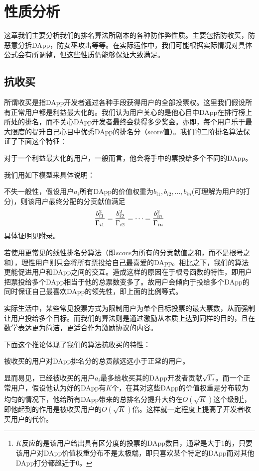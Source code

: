 \section{性质分析}
\label{section:properties}
这章我们主要分析我们的排名算法所剧本的各种防作弊性质。主要包括防收买，防恶意分拆DApp，防女巫攻击等等。在实际运作中，我们可能根据实际情况对具体公式会有所调整，但这些性质仍能够保证大致满足。

\subsection{抗收买}
所谓收买是指DApp开发者通过各种手段获得用户的全部投票权。这里我们假设所有正常用户都是利益最大化的。我们认为用户关心的是他心目中DApp在排行榜上所处的排名，而不关心DApp开发者最终会获得多少奖金。亦即，每个用户乐于最大限度的提升自己心目中优秀DApp的排名分（score值）。我们的二阶排名算法保证了下面这个特征：

\begin{property}
	\label{p1}
	对于一个利益最大化的用户，一般而言，他会将手中的票投给多个不同的DApp。
\end{property}
我们用如下模型来具体说明：

不失一般性，假设用户$a_i$所有DApp的价值权重为$b_{i1},b_{i2},...,b_{in}$(可理解为用户的打分)，则该用户最终分配的分贡献值满足
$$\frac{b_{i1}^2}{\Gamma_{i1}}=\frac{b_{i2}^2}{\Gamma_{i2}}=\cdots=\frac{b_{in}^2}{\Gamma_{in}}$$
具体证明见附录。

若使用更常见的线性排名分算法（即$score$为所有的分贡献值之和，而不是根号之和），理性用户则只会将所有票投给自己最喜爱的DApp。相比之下，我们的算法更能促进用户和DApp之间的交互。造成这样的原因在于根号函数的特性，即用户把票投给多个DApp相当于他的总票数变多了。故用户会倾向于投给多个DApp的同时保证自己最喜欢DApp的领先性，即上面的比例等式。

实际生活中，某些常见投票方式为限制用户为单个目标投票的最大票数，从而强制让用户投给多个目标。而我们的算法则是通过激励从本质上达到同样的目的，且在数学表达更为简洁，更适合作为激励协议的内容。

下面这个推论体现了我们的算法抗收买的特性：
\begin{corollary}
被收买的用户对DApp排名分的总贡献远远小于正常的用户。
\end{corollary}
显而易见，已经被收买的用户$a_i$最多给收买其的DApp开发者贡献$\sqrt{\Gamma_i}$。而一个正常用户，假设他认为好的DApp有$K$个，在其对这些DApp的价值权重是分布较为均匀的情况下，他给所有DApp带来的总排名分提升大约在$O(\sqrt{K})$这个级别\footnote{$K$反应的是该用户给出具有区分度的投票的DApp数目，通常是大于1的，只要该用户对DApp价值权重分布不是太极端，即只喜欢某个特定的DApp而对其他DApp打分都趋近于0。}，即他起到的作用是被收买用户的$O(\sqrt{K})$倍。这样就一定程度上提高了开发者收买用户的代价。

